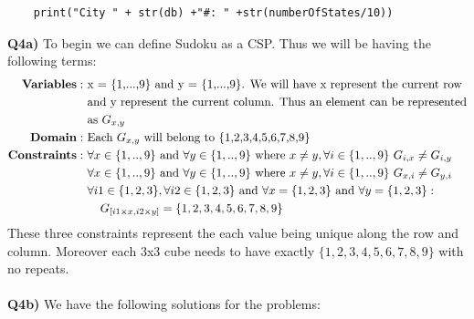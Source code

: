 \documentclass{article}
\begin{document}
\begin{titlepage}
\begin{lstlisting}
    print("City " + str(db) +"#: " +str(numberOfStates/10))
\end{lstlisting}
\newpage
\textbf{Q4a)} To begin we can define Sudoku as a CSP. Thus we will be having the following terms:
\begin{align*}
\textbf{Variables}: & \text{ x = \{1,...,9\} and y = \{1,...,9\}. We will have x represent the current row} \\
&\text{ and y represent the current column. Thus an element can be represented} \\
&\text{ as }G_{x,y}  \\
\textbf{Domain}: & \text{ Each } G_{x,y} \text{ will belong to \{1,2,3,4,5,6,7,8,9\} } \\
\textbf{Constraints}: & \text{ } \forall x \in \{1,..,9\} \text{ and } \forall y \in \{1,..,9\} \text{ where } x \neq y, \forall i \in \{1,..,9\} \text{ } G_{i,x} \neq G_{i,y} \\
& \text{ } \forall x \in \{1,..,9\} \text{ and } \forall y \in \{1,..,9\} \text{ where } x \neq y, \forall i \in \{1,..,9\} \text{ } G_{x,i} \neq G_{y,i} \\
& \text{ } \forall i1 \in \{1,2,3\}, \forall i2 \in \{1,2,3\} \text{ and } \forall x = \{1,2,3\} \text { and } \forall y = \{1,2,3\}: \\
& \hspace{0.5cm} G_{[i1\times x, i2 \times y]} = \{1,2,3,4,5,6,7,8,9\}
\end{align*}
These three constraints represent the each value being unique along the row and column. Moreover each 3x3 cube needs to have exactly $\{1,2,3,4,5,6,7,8,9\}$ with no repeats. \\\\
\textbf{Q4b)} We have the following solutions for the problems:


\end{titlepage}
\end{document}
